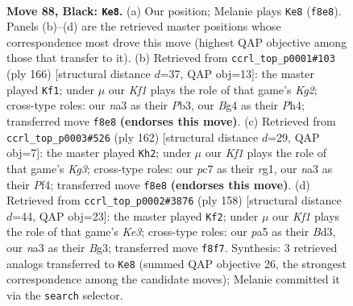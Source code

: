 \documentclass[11pt]{article}
\begin{document}
\clearpage

\begin{figure}[p]\centering
\begin{subfigure}{0.46\textwidth}\centering
\resizebox{\linewidth}{!}{%
\newchessgame
\chessboard[
  setfen={2n2k1K/2P5/p7/P4p1p/4pBb1/Nr4P1/8/R7 b - - 83 88},
  showmover=false,
  pgfstyle=straightmove, color=movearrow, markmove={f8-e8}
]}
\caption{}
\end{subfigure}\hfill
\begin{subfigure}{0.46\textwidth}\centering
\resizebox{\linewidth}{!}{%
\newchessgame
\chessboard[
  setfen={8/2b1k3/5p2/pR3B1p/P3P2P/1Pr5/6K1/8 w - - 3 84},
  showmover=false,
  pgfstyle=straightmove, color=movearrow, markmove={g2-f1}
]}
\caption{}
\end{subfigure}
\\[4pt]
\begin{subfigure}{0.46\textwidth}\centering
\resizebox{\linewidth}{!}{%
\newchessgame
\chessboard[
  setfen={8/7p/1p3k2/1BbR1p1P/P1P2P2/6K1/8/6r1 w - - 83 82},
  showmover=false,
  pgfstyle=straightmove, color=movearrow, markmove={g3-h2}
]}
\caption{}
\end{subfigure}\hfill
\begin{subfigure}{0.46\textwidth}\centering
\resizebox{\linewidth}{!}{%
\newchessgame
\chessboard[
  setfen={4k3/1b6/p5p1/P2P1pP1/1PP5/3BK1Br/8/8 w - - 3 80},
  showmover=false,
  pgfstyle=straightmove, color=movearrow, markmove={e3-f2}
]}
\caption{}
\end{subfigure}
\caption{\textbf{Move 88, Black: \texttt{Ke8}.} (a) Our position; Melanie plays \texttt{Ke8} (\texttt{f8e8}). Panels (b)--(d) are the retrieved master positions whose correspondence most drove this move (highest QAP objective among those that transfer to it). (b) Retrieved from \texttt{ccrl\_top\_p0001\#103} (ply 166) [structural distance $d$=37, QAP obj=13]: the master played \texttt{Kf1}; under $\mu$ our \emph{Kf1} plays the role of that game's \emph{Kg2}; cross-type roles: our \emph{n}a3 as their \emph{P}b3, our \emph{B}g4 as their \emph{P}h4; transferred move \texttt{f8e8} \textbf{(endorses this move)}. (c) Retrieved from \texttt{ccrl\_top\_p0003\#526} (ply 162) [structural distance $d$=29, QAP obj=7]: the master played \texttt{Kh2}; under $\mu$ our \emph{Kf1} plays the role of that game's \emph{Kg3}; cross-type roles: our \emph{p}c7 as their \emph{r}g1, our \emph{n}a3 as their \emph{P}f4; transferred move \texttt{f8e8} \textbf{(endorses this move)}. (d) Retrieved from \texttt{ccrl\_top\_p0002\#3876} (ply 158) [structural distance $d$=44, QAP obj=23]: the master played \texttt{Kf2}; under $\mu$ our \emph{Kf1} plays the role of that game's \emph{Ke3}; cross-type roles: our \emph{p}a5 as their \emph{B}d3, our \emph{n}a3 as their \emph{B}g3; transferred move \texttt{f8f7}. Synthesis: 3 retrieved analogs transferred to \texttt{Ke8} (summed QAP objective 26, the strongest correspondence among the candidate moves); Melanie committed it via the \texttt{search} selector.}
\label{fig:thought-m175}
\end{figure}
\end{document}
